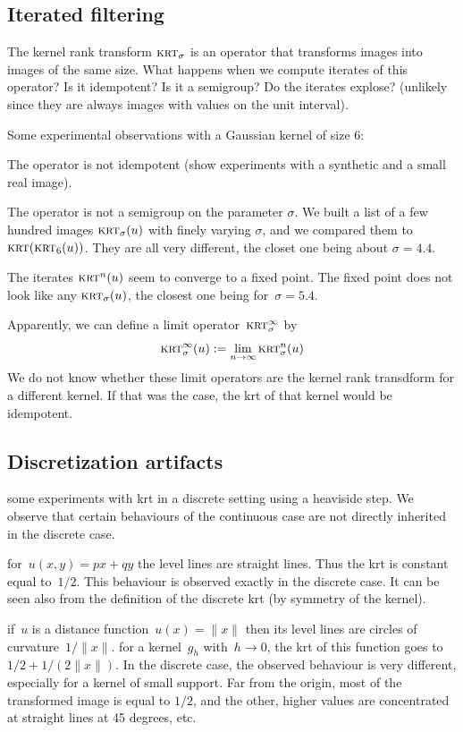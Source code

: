 \documentclass[12pt]{article}                  %
\begin{document}
\subsection{Iterated filtering}

The kernel rank transform $\textsc{krt}_\sigma$ is an operator that transforms images into images of the same size.
What happens when we compute iterates of this operator?   Is it idempotent?  Is it a semigroup?  Do the iterates explose? (unlikely since they are always images with values on the unit interval).

Some experimental observations with a Gaussian kernel of size
6:

The operator is not idempotent (show experiments with a synthetic and a small real image).

The operator is not a semigroup on the parameter $\sigma$.  We built a list
of a few hundred images $\textsc{krt}_\sigma(u)$ with finely varying
$\sigma$, and we compared them to $\textsc{krt}(\textsc{krt}_6(u))$.  They are all very different, the closet one being about $\sigma=4.4$.

The iterates $\textsc{krt}^n(u)$ seem to converge to a fixed point.  The
fixed point does not look like any $\textsc{krt}_\sigma(u)$, the closest one being for~$\sigma=5.4$.

Apparently, we can define a limit operator~$\textsc{krt}^\infty_\sigma$ by
\[
	\textsc{krt}^\infty_\sigma(u) := \lim_{n\to\infty}\textsc{krt}^n_\sigma(u)
\]
We do not know whether these limit operators are the kernel rank transdform
for a different kernel.   If that was the case, the krt of that kernel
would be idempotent.

\subsection{Discretization artifacts}

some experiments with krt in a discrete setting using a heaviside step.
We observe that certain behaviours of the continuous case are not directly
inherited in the discrete case.

for~$u(x,y)=px+qy$ the level lines are straight lines.  Thus the krt is
constant equal to~$1/2$.  This behaviour is observed exactly in the discrete
case.  It can be seen also from the definition of the discrete krt (by
symmetry of the kernel).

if~$u$ is a distance function~$u(x)=\|x\|$ then its level lines are circles
of curvature~$1/\|x\|$.  for a kernel~$g_h$ with~$h\to 0$, the krt of this
function goes to~$1/2+1/(2\|x\|)$.  In the discrete case, the observed
behaviour is very different, especially for a kernel of small support.  Far
from the origin, most of the transformed image is equal to $1/2$, and the
other, higher values are concentrated at straight lines at 45 degrees, etc.
\end{document}
